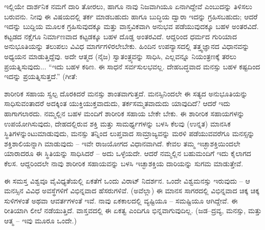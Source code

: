 ಇಲ್ಲಿಯೇ ದಾರ್ಶನಿಕ ನಮಗೆ ದಾರಿ ತೋರಲು, ಹಾಗೂ ನಾವು ನಿಜವಾಗಿಯೂ ಏನಾಗಿದ್ದೇವೆ ಎಂಬುದನ್ನು ತಿಳಿಸಲು ಬರುವನು. ನೀವು ಈ ವಿಷಯದಲ್ಲಿ ತರ್ಕ ಮಾಡಬಹುದು ಹಾಗೂ ಬುದ್ಧಿಯ ದ್ವಾರಾ ಇದನ್ನು ಗ್ರಹಿಸಬಹುದು; ಆದರೆ ಇದನ್ನು ಬುದ್ದಿಯ ಮೂಲಕ ಗ್ರಹಿಸುವುದಕ್ಕೂ ಮತ್ತು ವಾಸ್ತವಿಕವಾಗಿ ಅನುಭವ ಪಡೆಯುವುದಕ್ಕೂ ಬಹಳ ಅಂತರವಿದೆ. ಕಟ್ಟಡದ ನಕ್ಷೆಗೂ ನಿರ್ಮಾಣವಾದ ಕಟ್ಟಡಕ್ಕೂ ಬಹಳ ದೊಡ್ಡ ಅಂತರವಿದೆ. ಆದ್ದರಿಂದ ಧರ್ಮದ ಗುರಿಯಾದ ಅನುಭೂತಿಯನ್ನು ತಲುಪಲು ವಿವಿಧ ಮಾರ್ಗಗಳಿರಲೇಬೇಕು. ಹಿಂದಿನ ಉಪನ್ಯಾಸದಲ್ಲಿ ತತ್ತ್ವಜ್ಞಾನದ ವಿಧಾನವನ್ನು ಅಧ್ಯಯನ ಮಾಡುತ್ತಿದ್ದೆವು. ಅದೇ ಆತ್ಮದ (ನೈಜ) ಸ್ವಾತಂತ್ರ್ಯವನ್ನು ಸಾಧಿಸಿ, ಎಲ್ಲವನ್ನೂ ನಿಯಂತ್ರಣಕ್ಕೆ ತರಲು ಪ್ರಯತ್ನಿಸುವುದು... “ಇದು ಬಹಳ ಕಠಿಣ. ಈ ಸಾಧನೆ ಸರ್ವಸುಲಭವಲ್ಲ. ದೇಹಬದ್ಧವಾದ ಮನಸ್ಸು ಬಹಳ ಕಷ್ಟದಿಂದ ಇದನ್ನು ಪ್ರಯತ್ನಿಸುತ್ತದೆ.” (ಗೀತೆ: 

\vskip 1.5pt

ಶಾರೀರಿಕ ಸಹಾಯ ಸ್ವಲ್ಪ ದೊರಕಿದರೆ ಮನಸ್ಸು ಶಾಂತವಾಗುತ್ತದೆ. ಮನಸ್ಸಿನಿಂದಲೇ ಈ ಸತ್ಯದ ಅನುಭೂತಿಯನ್ನು ಸಾಧಿಸುವಂತಾದರೆ ಅದಕ್ಕಿಂತ ಯುಕ್ತಿಯುಕ್ತವಾದುದು, ತರ್ಕಸಮ್ಮತವಾದುದು ಯಾವುದಿದೆ? ಆದರೆ ಇದು ಹಾಗಾಗಲಾರದು. ನಮ್ಮಲ್ಲಿನ ಬಹಳ ಮಂದಿಗೆ ಶಾರೀರಿಕ ಸಹಾಯ ಬೇಕೇ ಬೇಕು. ಈ ಶಾರೀರಿಕ ಸಹಾಯಗಳನ್ನು ಉಪಯೋಗಿಸುವುದು, ದೇಹದಲ್ಲಿರುವ ಶಕ್ತಿ ಮತ್ತು ಸಾಮರ್ಥ್ಯಗಳನ್ನು ಬಳಸಿ ಕೆಲವು (ಉನ್ನತ) ಮಾನಸಿಕ ಸ್ಥಿತಿಗಳನ್ನುಂಟುಮಾಡುವುದು, ಮನಸ್ಸು ತನ್ನಿಂದ ಲುಪ್ತವಾದ ಸಾಮ್ರಾಜ್ಯವನ್ನು ಮರಳಿ ಪಡೆಯುವವರೆಗೂ ಮನಸ್ಸನ್ನು ಶಕ್ತಿಶಾಲಿಯನ್ನಾಗಿ ಮಾಡುವುದು – ಇವೇ ರಾಜಯೋಗದ ವಿಧಾನವಾಗಿದೆ. ಕೇವಲ ತಮ್ಮ ಇಚ್ಛಾಶಕ್ತಿಯಿಂದಲೇ ಯಾರಾದರೂ ಈ ಸ್ಥಿತಿಯನ್ನು ಸಾಧಿಸಿದರೆ – ಅದು ಒಳ್ಳೆಯದೇ. ಆದರೆ ನಮ್ಮಲ್ಲಿನ ಬಹುಮಂದಿಗೆ ಇದು ಕೈಲಾಗದ ಕೆಲಸ. ಆದ್ದರಿಂದಲೇ ನಾವು ಶಾರೀರಿಕ ಸಹಾಯವನ್ನು ಬಳಸಿ ಇಚ್ಛಾಶಕ್ತಿಯ ದಾರಿಯನ್ನು ಸುಗಮ ಮಾಡುತ್ತೇವೆ.

\vskip 1.5pt

ಈ ಸಮಸ್ತ ವಿಶ್ವವೂ ವೈವಿಧ್ಯತೆಯಲ್ಲಿ ಏಕತೆಗೆ ಒಂದು ವಿರಾಟ್ ನಿದರ್ಶನ. ಒಂದೇ ವಿಶ್ವಮನಸ್ಸು ಇರುವುದು – ಆ ಮನಸ್ಸಿನ ವಿವಿಧ ಅವಸ್ಥೆಗಳಿಗೆ ವಿಭಿನ್ನವಾದ ಹೆಸರುಗಳಿವೆ. (ಅವೆಲ್ಲಾ) ಈ ಮಾನಸ ಸಾಗರದಲ್ಲಿ ವಿಭಿನ್ನವಾದ ಚಿಕ್ಕ ಚಿಕ್ಕ ಸುಳಿಗಳಂತೆ ಅಥವಾ ಆವರ್ತಗಳಂತೆ ಇವೆ. ನಾವು ಏಕಕಾಲದಲ್ಲಿ ವ್ಯಷ್ಟಿಯೂ – ಸಮಷ್ಟಿಯೂ ಆಗಿದ್ದೇವೆ. ಈ ರೀತಿಯಾಗಿ ಲೀಲೆ ನಡೆಯುತ್ತಿದೆ. ವಾಸ್ತವದಲ್ಲಿ ಈ ಏಕತ್ವ ಎಂದಿಗೂ ಭಿನ್ನವಾಗುವುದಿಲ್ಲ. (ಜಡ–ದ್ರವ್ಯ, ಮನಸ್ಸು, ಮತ್ತು ಆತ್ಮ – ಇವು ಮೂರೂ ಒಂದೇ.)

\vskip 1.5pt

